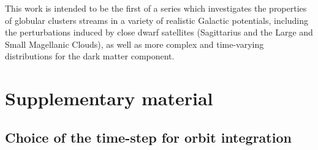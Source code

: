     This work is intended to be the first of a series which investigates the properties of globular clusters streams in a variety of realistic Galactic potentials, including the perturbations induced by close dwarf satellites (Sagittarius and the Large and Small Magellanic Clouds), as well as more complex and time-varying distributions for the dark matter component. 


\section{Supplementary material}
    \subsection{Choice of the time-step for orbit integration}\label{deltat}

